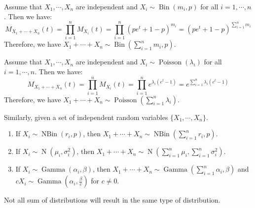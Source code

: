 \documentclass{huhtakm-template-book-v2}
\DeclareMathOperator{\Bin}{Bin}
\DeclareMathOperator{\Poisson}{Poisson}
\DeclareMathOperator{\N}{N}
\DeclareMathOperator{\NBin}{NBin}
\DeclareMathOperator{\Gam}{Gamma}
\begin{document}
\begin{eg}
	Assume that $X_{1},\cdots,X_{n}$ are independent and $X_{i}\sim\Bin(m_{i},p)$ for all $i=1,\cdots,n$. Then we have:
	\begin{equation*}
		M_{X_{1}+\cdots+X_{n}}(t)=\prod_{i=1}^{n}M_{X_{i}}(t)=\prod_{i=1}^{n}(pe^{t}+1-p)^{m_{i}}=(pe^{t}+1-p)^{\sum_{i=1}^{n}m_{i}}
	\end{equation*}
	Therefore, we have $X_{1}+\cdots+X_{n}\sim\Bin(\sum_{i=1}^{n}m_{i},p)$.
\end{eg}
\begin{eg}
	Assume that $X_{1},\cdots,X_{n}$ are independent and $X_{i}\sim\Poisson(\lambda_{i})$ for all $i=1,\cdots,n$. Then we have:
	\begin{equation*}
		M_{X_{1}+\cdots+X_{n}}(t)=\prod_{i=1}^{n}M_{X_{i}}(t)=\prod_{i=1}^{n}e^{\lambda_{i}(e^{t}-1)}=e^{\sum_{i=1}^{n}\lambda_{i}(e^{t}-1)}
	\end{equation*}
	Therefore, we have $X_{1}+\cdots+X_{n}\sim\Poisson(\sum_{i=1}^{n}\lambda_{i})$.
\end{eg}
\begin{eg}
	Similarly, given a set of independent random variables $\{X_{1},\cdots,X_{n}\}$.
	\begin{enumerate}
		\item If $X_{i}\sim\NBin(r_{i},p)$, then $X_{1}+\cdots+X_{n}\sim\NBin(\sum_{i=1}^{n}r_{i},p)$.
		\item If $X_{i}\sim\N(\mu_{i},\sigma_{i}^{2})$, then $X_{1}+\cdots+X_{n}\sim\N(\sum_{i=1}^{n}\mu_{i},\sum_{i=1}^{n}\sigma_{i}^{2})$.
		\item If $X_{i}\sim\Gam(\alpha_{i},\beta)$, then $X_{1}+\cdots+X_{n}\sim\Gam(\sum_{i=1}^{n}\alpha_{i},\beta)$ and $cX_{i}\sim\Gam(\alpha_{i},\frac{\beta}{c})$ for $c\neq 0$.
	\end{enumerate}
\end{eg}
\begin{rem}
	Not all sum of distributions will result in the same type of distribution.
\end{rem}
\end{document}
